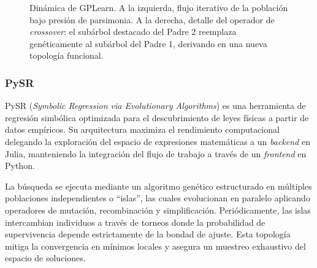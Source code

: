 \documentclass[11pt, a4paper]{article}
\begin{document}
\begin{figure}[h]
    \caption{Dinámica de GPLearn. A la izquierda, flujo iterativo de la población bajo presión de parsimonia. A la derecha, detalle del operador de \textit{crossover}: el subárbol destacado del Padre 2 reemplaza genéticamente al subárbol del Padre 1, derivando en una nueva topología funcional.}
    \label{fig:gplearn_detailed}
\end{figure}


\subsubsection{PySR}

PySR (\textit{Symbolic Regression via Evolutionary Algorithms}) \cite{cranmer2023pysr} es una herramienta de regresión simbólica optimizada para el descubrimiento de leyes físicas a partir de datos empíricos. Su arquitectura maximiza el rendimiento computacional delegando la exploración del espacio de expresiones matemáticas a un \textit{backend} en Julia, manteniendo la integración del flujo de trabajo a través de un \textit{frontend} en Python.

La búsqueda se ejecuta mediante un algoritmo genético estructurado en múltiples poblaciones independientes o ``islas'', las cuales evolucionan en paralelo aplicando operadores de mutación, recombinación y simplificación. Periódicamente, las islas intercambian individuos a través de torneos donde la probabilidad de supervivencia depende estrictamente de la bondad de ajuste. Esta topología mitiga la convergencia en mínimos locales y asegura un muestreo exhaustivo del espacio de soluciones.
\end{document}
